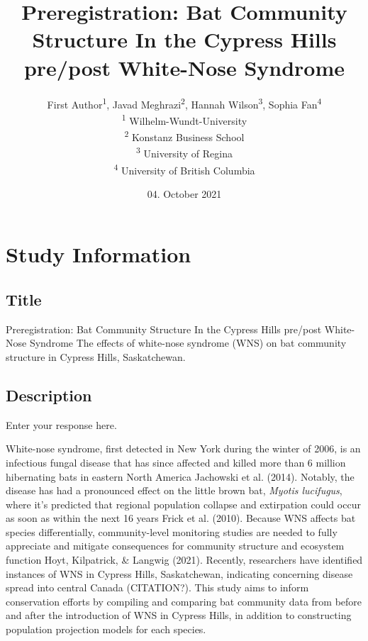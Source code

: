\documentclass[]{article}
\title{Preregistration: Bat Community Structure In the Cypress Hills
pre/post White-Nose Syndrome}
\author{
          First Author\textsuperscript{1},
          Javad Meghrazi\textsuperscript{2},
          Hannah Wilson\textsuperscript{3},
          Sophia Fan\textsuperscript{4}          \\ \vspace{0.5cm}
              \textsuperscript{1} Wilhelm-Wundt-University\\
              \textsuperscript{2} Konstanz Business School\\
              \textsuperscript{3} University of Regina\\
              \textsuperscript{4} University of British Columbia      }
\date{04. October 2021}
\newcounter{question}
\begin{document}
\maketitle
\vspace{2pc}


\newcommand\Question[2]{%
   \leavevmode\par
   \stepcounter{question}
   \noindent
   \textbf{\thequestion. #1}. #2\par}

\newcommand\Answer[1]{%
    \noindent
    \textit{Registered response}: #1\par}
    
\hypertarget{study-information}{%
\section{Study Information}\label{study-information}}

\hypertarget{title}{%
\subsection{Title}\label{title}}

Preregistration: Bat Community Structure In the Cypress Hills pre/post
White-Nose Syndrome The effects of white-nose syndrome (WNS) on bat
community structure in Cypress Hills, Saskatchewan.

\hypertarget{description}{%
\subsection{Description}\label{description}}

Enter your response here.

White-nose syndrome, first detected in New York during the winter of
2006, is an infectious fungal disease that has since affected and killed
more than 6 million hibernating bats in eastern North America Jachowski
et al. (2014). Notably, the disease has had a pronounced effect on the
little brown bat, \emph{Myotis lucifugus}, where it's predicted that
regional population collapse and extirpation could occur as soon as
within the next 16 years Frick et al. (2010). Because WNS affects bat
species differentially, community-level monitoring studies are needed to
fully appreciate and mitigate consequences for community structure and
ecosystem function Hoyt, Kilpatrick, \& Langwig (2021). Recently,
researchers have identified instances of WNS in Cypress Hills,
Saskatchewan, indicating concerning disease spread into central Canada
(CITATION?). This study aims to inform conservation efforts by compiling
and comparing bat community data from before and after the introduction
of WNS in Cypress Hills, in addition to constructing population
projection models for each species.
\end{document}

